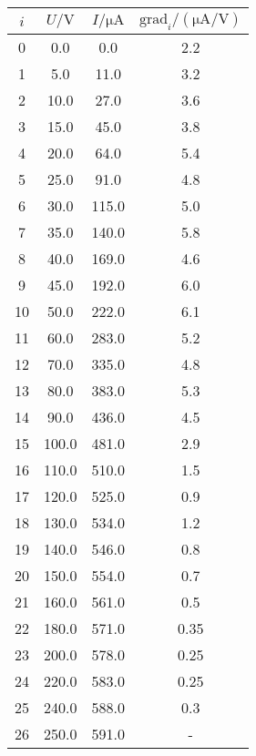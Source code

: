 \begin{table}
    \centering
    \begin{tabular}{S[table-format=:.0] S S S}
        \toprule
        {$i$} &
        {$U / \unit{\volt}$} &
        {$I/ \unit{\micro\ampere}$} &
        {$\text{grad}_i/ (\unit{\micro\ampere\per\volt})$} \\
           & 0.0       & 0.0      & 2.2 \\
        1   & 5.0       & 11.0     & 3.2 \\
        2   & 10.0      & 27.0     & 3.6 \\
        3   & 15.0      & 45.0     & 3.8 \\
        4   & 20.0      & 64.0     & 5.4 \\
        5   & 25.0      & 91.0     & 4.8 \\
        6   & 30.0      & 115.0    & 5.0 \\
        7   & 35.0      & 140.0    & 5.8 \\
        8   & 40.0      & 169.0    & 4.6 \\
        9   & 45.0      & 192.0    & 6.0 \\
        10  & 50.0      & 222.0    & 6.1 \\
        11  & 60.0      & 283.0    & 5.2 \\
        12  & 70.0      & 335.0    & 4.8 \\
        13  & 80.0      & 383.0    & 5.3 \\
        14  & 90.0      & 436.0    & 4.5 \\
        15  & 100.0     & 481.0    & 2.9 \\
        16  & 110.0     & 510.0    & 1.5 \\
        17  & 120.0     & 525.0    & 0.9 \\
        18  & 130.0     & 534.0    & 1.2 \\
        19  & 140.0     & 546.0    & 0.8 \\
        20  & 150.0     & 554.0    & 0.7 \\
        21  & 160.0     & 561.0    & 0.5 \\
        22  & 180.0     & 571.0    & 0.35 \\
        23  & 200.0     & 578.0    & 0.25 \\
        24  & 220.0     & 583.0    & 0.25 \\
        25  & 240.0     & 588.0    & 0.3 \\
        26  & 250.0     & 591.0    & {-} \\
        \bottomrule
    \end{tabular}
    \caption{}
\end{table}
